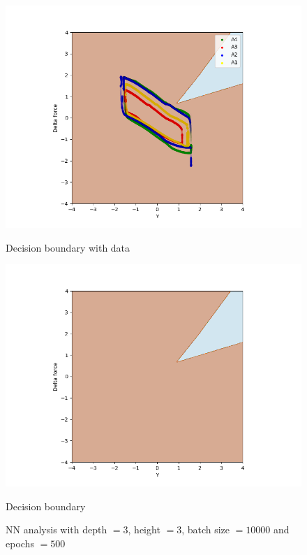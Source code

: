             \begin{figure}[]
                \begin{minipage}[b]{0.5\linewidth}
                    \centering
                    \includegraphics[width = 1\textwidth]{figures/analysis/nn/neural_net_h3_d3_e500_b10000.png}
                    \caption*{Decision boundary with data}
                \end{minipage}
                \hfill
                \begin{minipage}[b]{0.5\linewidth}
                    \centering
                    \includegraphics[width = 1\textwidth]{figures/analysis/nn/neural_net_h3_d3_e500_b10000countour.png}
                    \caption*{Decision boundary}
                \end{minipage}
                \caption{NN analysis with depth $= 3$, height $=3$, batch size $=10000$ and epochs $=500$}
                \label{fig:nn_servo_underfit}
            \end{figure}
        
